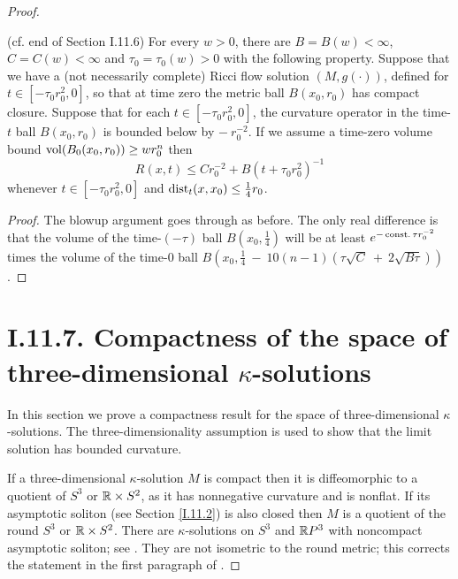 \begin{proof}
\begin{corollary}
  \label{cor:kl-curvature-bounds-ricci-flow-solutions-nonnegative-curvature-operator-ass-existence-curvature-operators-3}
 (cf. end of Section I.11.6)\label{I.11.6end}
For every $w > 0$, there are $B = B(w) < \infty$, $C = C(w) < \infty$ and
$\tau_0 = \tau_0(w) > 0$ with the following property.
Suppose that we have a (not necessarily complete) Ricci flow
solution $(M, g(\cdot))$, defined for $t \in [- \tau_0 r_0^2, 0]$, so that at time zero
the metric ball $B(x_0, r_0)$ has compact closure. Suppose that
for each $t \in [- \tau_0 r_0^2, 0]$, the
curvature operator in the
time-$t$ ball $B(x_0, r_0)$ is bounded below by $- \: r_0^{-2}$.
If we assume a time-zero volume bound $\operatorname{vol}(B_0(x_0, r_0))
\ge w r_0^n$ then
\begin{equation}
R(x,t) \le C r_0^{-2} + B (t + \tau_0 r_0^2)^{-1}
\end{equation}
whenever $t \in [- \tau_0 r_0^2,0]$ and $\operatorname{dist}_t(x, x_0) \le \frac14 r_0$.
\end{corollary}
\begin{proof}
The blowup argument goes through as before.
The only real difference is that the volume of the
time-$(- \tau)$ ball $B(x_0, \frac14)$ will be at least
$e^{-\operatorname{const.} \tau r_0^{-2}}$ times the volume of the
time-$0$ ball $B(x_0, \frac14 \: - \: 10(n-1)(\tau \sqrt{C} \: + \:
2 \sqrt{B \tau}))$.
\end{proof}

\section{I.11.7. Compactness of the space of three-dimensional
$\kappa$-solutions}
\label{pf11.7}

In this section we prove a compactness result for the space of three-dimensional
$\kappa$-solutions.  The three-dimensionality assumption is used to
show that
the limit solution has bounded curvature.

If a three-dimensional $\kappa$-solution $M$ is compact then it is
diffeomorphic to a quotient of $S^3$ or ${\mathbb R} \times S^2$, as it has
nonnegative curvature and is nonflat.
If its asymptotic
soliton (see Section \ref{I.11.2}) is also closed then
$M$ is a quotient of the round $S^3$ or ${\mathbb R} \times S^2$.
There are $\kappa$-solutions on $S^3$ and ${\mathbb R} P^3$ with noncompact
asymptotic soliton; see \cite[Section 1.4]{Perelman2}.
They are not isometric to the round metric; this corrects the statement in
the first paragraph of \cite[Section 11.7]{Perelman}.


\end{proof}
